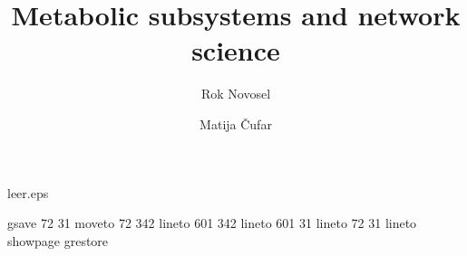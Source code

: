 \begin{filecontents}{leer.eps}

gsave
72 31 moveto
72 342 lineto
601 342 lineto
601 31 lineto
72 31 lineto
showpage
grestore
\end{filecontents}
%
\documentclass[epj]{svjour}
%
\usepackage{graphicx}
%

%
\title{Metabolic subsystems and network science}
\author{Rok Novosel \and Matija \v{C}ufar
}                     %
%
%
%


\maketitle

\section{Introduction}
\label{sec:intro}
Metabolic networks~\cite{jeong2000large} are used to model metabolism in various organisms. We usually have two types of vertices in a metabolic network: reactions and chemicals produced and consumed by the reactions. The most correct way to represent this kind of structure is with a bipartite network, where edges connect chemicals to reactions. Furthermore, the edges are directed indicating whether the chemical was produced or consumed. 

